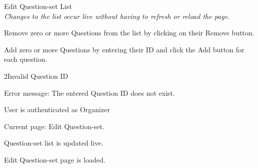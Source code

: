 
\begin{uc}{Edit Question-set List} \\
	\emph{Changes to the list occur live without having to refresh or reload the page.}\\
    \begin{uc-mss}
    \item Remove zero or more Questions from the list by clicking on their Remove button.
	\item Add zero or more Questions by entering their ID and click the Add button for
	each question.
    \end{uc-mss}

    \begin{uc-ext}

        \begin{uc-fail}{2}{Invalid Question ID}
        \item Error message: The entered Question ID does not exist.
        \end{uc-fail}

    \end{uc-ext}

    \begin{uc-pre}
    \item User is authenticated as Organizer
    \item Current page: Edit Question-set.
    \end{uc-pre}

    \begin{uc-post}
    \item Question-set list is updated live.
    \end{uc-post}

    \begin{uc-trig}
        Edit Question-set page is loaded.
    \end{uc-trig}

\end{uc}
